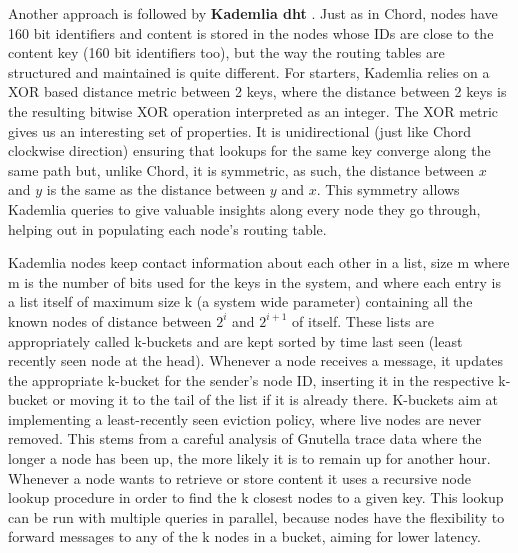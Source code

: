 Another approach is followed by \textbf{Kademlia \acrshort{dht}} \cite{Maymounkov2002}.
Just as in Chord, nodes have 160 bit identifiers and content is
stored in the nodes whose IDs are close to the content key (160 bit
identifiers too), but the way the routing tables are structured and
maintained is quite different. For starters, Kademlia relies on a XOR
based distance metric between 2 keys, where the distance between 2 keys
is the resulting bitwise XOR operation interpreted as an integer. The
XOR metric gives us an interesting set of properties. It is
unidirectional (just like Chord clockwise direction) ensuring that
lookups for the same key converge along the same path but, unlike Chord,
it is symmetric, as such, the distance between $x$ and $y$ is the same as
the distance between $y$ and $x$. This symmetry allows Kademlia queries to
give valuable insights along every node they go through, helping out in
populating each node's routing table.

Kademlia nodes keep contact information about each other in a list, size
m where m is the number of bits used for the keys in the system, and
where each entry is a list itself of maximum size k (a system wide
parameter) containing all the known nodes of distance between $2^{i}$ and
$2^{i+1}$ of itself. These lists
are appropriately called k-buckets and are kept sorted by time last seen
(least recently seen node at the head). Whenever a node receives a
message, it updates the appropriate k-bucket for the sender's node ID,
inserting it in the respective k-bucket or moving it to the tail of the
list if it is already there. K-buckets aim at implementing a
least-recently seen eviction policy, where live nodes are never removed.
This stems from a careful analysis of Gnutella trace data \cite{Saroiu2002}
where the longer a node has been up, the more likely
it is to remain up for another hour. Whenever a node wants to retrieve
or store content it uses a recursive node lookup procedure in order to
find the k closest nodes to a given key. This lookup can be run with
multiple queries in parallel, because nodes have the flexibility to
forward messages to any of the k nodes in a bucket, aiming for lower
latency.

